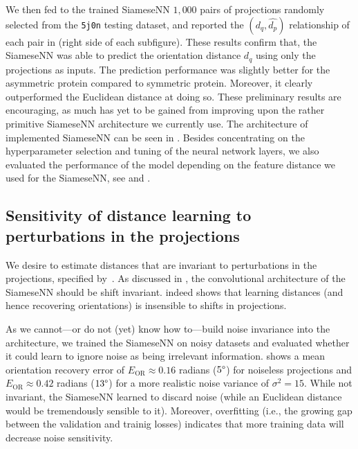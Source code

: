 We then fed to the trained SiameseNN $1,000$ pairs of projections randomly selected from the \texttt{5j0n} testing dataset, and reported the $(d_q,\widehat{d_p})$ relationship of each pair in  (right side of each subfigure).
These results confirm that, the SiameseNN was able to predict the orientation distance $d_q$ using only the projections as inputs.
The prediction performance was slightly better for the asymmetric protein compared to symmetric protein.
Moreover, it clearly outperformed the Euclidean distance at doing so.
These preliminary results are encouraging, as much has yet to be gained from improving upon the rather primitive SiameseNN architecture we currently use.
The architecture of implemented SiameseNN can be seen in .
Besides concentrating on the hyperparameter selection and tuning of the neural network layers, we also evaluated the performance of the model depending on the feature distance we used for the SiameseNN, see  and .


\subsection{Sensitivity of distance learning to perturbations in the projections}\label{sec:results:distance-estimation:sensitivity}


We desire to estimate distances that are invariant to perturbations in the projections, specified by~.
As discussed in , the convolutional architecture of the SiameseNN should be shift invariant.
 indeed shows that learning distances (and hence recovering orientations) is insensible to shifts in projections.

As we cannot---or do not (yet) know how to---build noise invariance into the architecture, we trained the SiameseNN on noisy datasets and evaluated whether it could learn to ignore noise as being irrelevant information.
 shows a mean orientation recovery error of $E_\text{OR} \approx 0.16$ radians ($5\degree$) for noiseless projections and $E_\text{OR} \approx 0.42$ radians ($13\degree$) for a more realistic noise variance of $\sigma^2=15$.
While not invariant, the SiameseNN learned to discard noise (while an Euclidean distance would be tremendously sensible to it).
Moreover, overfitting (i.e., the growing gap between the validation and trainig losses) indicates that more training data will decrease noise sensitivity.

